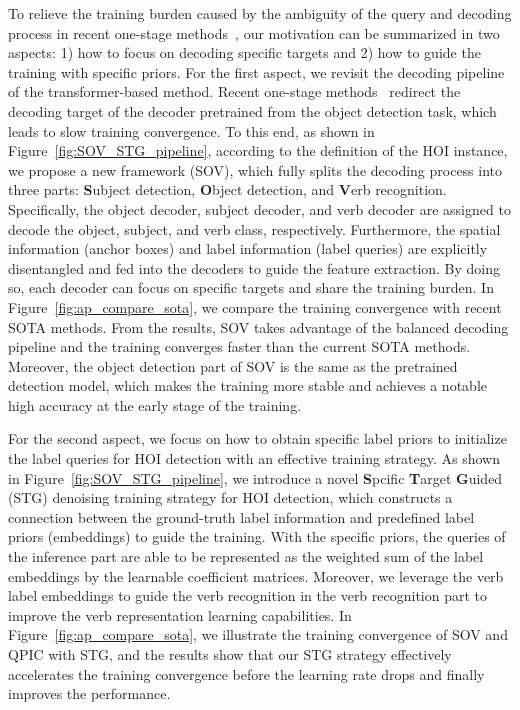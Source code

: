 \documentclass[10pt,twocolumn,letterpaper]{article}
\begin{document}
To relieve the training burden caused by the ambiguity of the query and decoding process in recent one-stage methods~\cite{tamura2021qpic,zhang2021mining,liao2022gen}, our motivation can be summarized in two aspects: 1) how to focus on decoding specific targets and 2) how to guide the training with specific priors.
For the first aspect, we revisit the decoding pipeline of the transformer-based method.
Recent one-stage methods~\cite{tamura2021qpic,zhang2021mining,liao2022gen} redirect the decoding target of the decoder pretrained from the object detection task, which leads to slow training convergence.
To this end, as shown in Figure~\ref{fig:SOV_STG_pipeline}, according to the definition of the HOI instance, we propose a new framework (SOV), which fully splits the decoding process into three parts: \textbf{S}ubject detection, \textbf{O}bject detection, and \textbf{V}erb recognition.
Specifically, the object decoder, subject decoder, and verb decoder are assigned to decode the object, subject, and verb class, respectively.
Furthermore, the spatial information (anchor boxes) and label information (label queries) are explicitly disentangled and fed into the decoders to guide the feature extraction.
By doing so, each decoder can focus on specific targets and share the training burden.
In Figure~\ref{fig:ap_compare_sota}, we compare the training convergence with recent SOTA methods.
From the results, SOV takes advantage of the balanced decoding pipeline and the training converges faster than the current SOTA methods.
Moreover, the object detection part of SOV is the same as the pretrained detection model, which makes the training more stable and achieves a notable high accuracy at the early stage of the training.

For the second aspect, we focus on how to obtain specific label priors to initialize the label queries for HOI detection with an effective training strategy.
As shown in Figure~\ref{fig:SOV_STG_pipeline}, we introduce a novel \textbf{S}pcific \textbf{T}arget \textbf{G}uided (STG) denoising training strategy for HOI detection, which constructs a connection between the ground-truth label information and predefined label priors (embeddings) to guide the training.
With the specific priors, the queries of the inference part are able to be represented as the weighted sum of the label embeddings by the learnable coefficient matrices.
Moreover, we leverage the verb label embeddings to guide the verb recognition in the verb recognition part to improve the verb representation learning capabilities.
In Figure~\ref{fig:ap_compare_sota}, we illustrate the training convergence of SOV and QPIC with STG, and the results show that our STG strategy effectively accelerates the training convergence before the learning rate drops and finally improves the performance.
\end{document}
